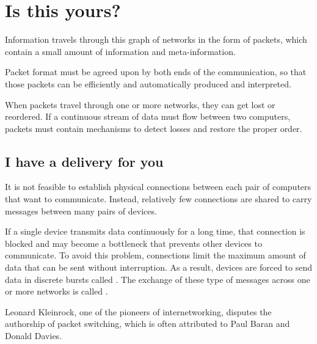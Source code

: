 
\chapter{Is this yours?}\label{sec:packets}

Information travels through this graph of networks in the form of packets, which contain a small amount of 
information and meta-information. 

Packet format must be agreed upon by both ends of the communication, so that those packets can be efficiently 
and automatically produced and interpreted.

When packets travel through one or more networks, they can get lost or reordered. If a continuous stream of data must 
flow between two computers, packets must contain mechanisms to detect losses and restore the proper order.

\section{I have a delivery for you}\label{sec:packets:lan_wan}

It is not feasible to establish physical connections between each pair of computers that want to communicate.
Instead, relatively few connections are shared to carry messages between many pairs of devices.

If a single device transmits data continuously for a long time, that connection is blocked and may become a bottleneck that 
prevents other devices to communicate. To avoid this problem, connections limit the maximum amount of data
that can be sent without interruption. As a result, devices are forced to send data in discrete bursts called 
. The exchange of these type of messages across one or more networks is called
.

\begin{remark}
%  
% 

Leonard Kleinrock, one of the pioneers of internetworking, disputes the authorship of packet switching,
which is often attributed to Paul Baran and Donald Davies.
\end{remark}

